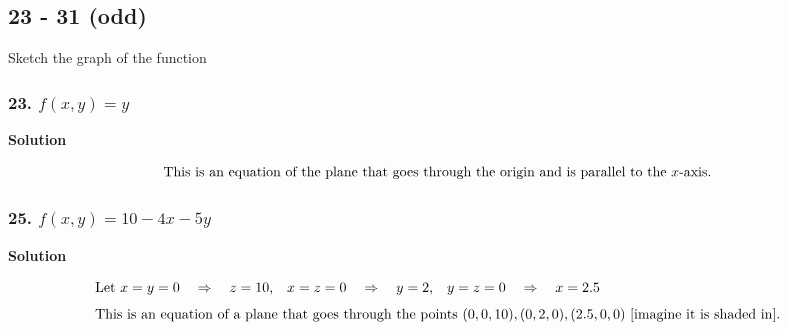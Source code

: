 \documentclass{article}
\newcommand\rr{\quad\Rightarrow\quad}
\begin{document}
\subsection*{23 - 31 (odd)}
Sketch the graph of the function
\subsubsection*{23. $f(x,y) = y$}
\centerline{\textbf{Solution}}
\begin{align*}
    \intertext{This is an equation of the plane that goes through the origin and is parallel to the $x$-axis.}
\end{align*}
\subsubsection*{25. $f(x,y) = 10 - 4x -5y$}
\centerline{\textbf{Solution}}
\begin{align*}
    \intertext{Let $x=y=0 \rr z = 10$,\quad $x = z = 0 \rr y = 2$,\quad $y = z = 0 \rr x = 2.5$}
    \intertext{This is an equation of a plane that goes through the points $(0,0,10), (0,2,0), (2.5,0,0)$ [imagine it is shaded in].}
\end{align*}
\end{document}
